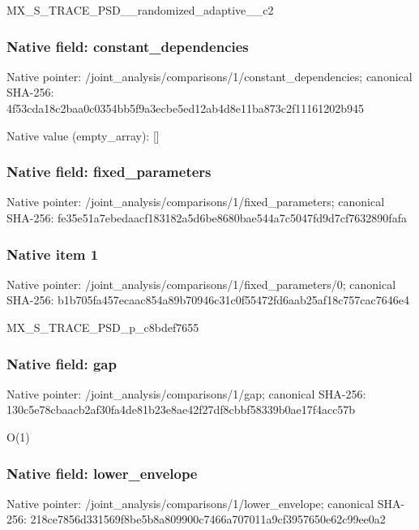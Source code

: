 \documentclass[10pt,a4paper]{article}
\begin{document}
\begingroup\raggedright\sloppy MX\_\allowbreak{}S\_\allowbreak{}TRACE\_\allowbreak{}PSD\_\allowbreak{}\_\allowbreak{}randomized\_\allowbreak{}adaptive\_\allowbreak{}\_\allowbreak{}c2\par\endgroup

\subsubsection{Native field: constant\_\allowbreak{}dependencies}
Native pointer: /joint\_\allowbreak{}analysis/comparisons/1/constant\_\allowbreak{}dependencies; canonical SHA-256: 4f53cda18c2baa0c0354bb5f9a3ecbe5ed12ab4d8e11ba873c2f11161202b945

Native value (empty\_\allowbreak{}array): []

\subsubsection{Native field: fixed\_\allowbreak{}parameters}
Native pointer: /joint\_\allowbreak{}analysis/comparisons/1/fixed\_\allowbreak{}parameters; canonical SHA-256: fe35e51a7ebedaacf183182a5d6be8680bae544a7c5047fd9d7cf7632890fafa

\subsubsection{Native item 1}
Native pointer: /joint\_\allowbreak{}analysis/comparisons/1/fixed\_\allowbreak{}parameters/0; canonical SHA-256: b1b705fa457ecaac854a89b70946c31c0f55472fd6aab25af18c757cac7646e4

\begingroup\raggedright\sloppy MX\_\allowbreak{}S\_\allowbreak{}TRACE\_\allowbreak{}PSD\_\allowbreak{}p\_\allowbreak{}c8bdef7655\par\endgroup

\subsubsection{Native field: gap}
Native pointer: /joint\_\allowbreak{}analysis/comparisons/1/gap; canonical SHA-256: 130c5e78cbaacb2af30fa4de81b23e8ae42f27df8cbbf58339b0ae17f4acc57b

\begingroup\raggedright\sloppy O(1)\par\endgroup

\subsubsection{Native field: lower\_\allowbreak{}envelope}
Native pointer: /joint\_\allowbreak{}analysis/comparisons/1/lower\_\allowbreak{}envelope; canonical SHA-256: 218ce7856d331569f8be5b8a809900c7466a707011a9cf3957650e62c99ee0a2
\end{document}
